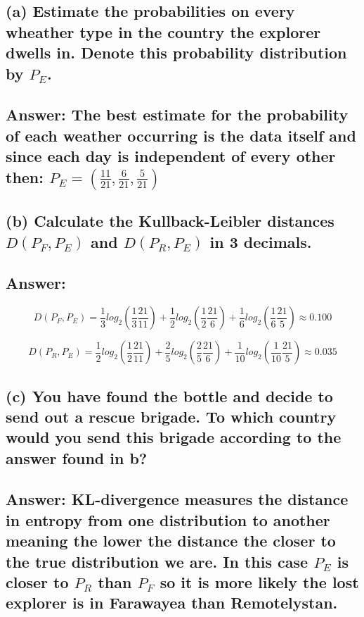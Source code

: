 \documentclass[11px]{article}
\begin{document}
\subsection*{\normalfont (a) Estimate the probabilities on every wheather type in the country the explorer dwells in. Denote this probability distribution by \(P_E\).}

\subsection*{Answer: The best estimate for the probability of each weather occurring is the data itself and since each day is independent of every other then: \(P_E = (\frac{11}{21}, \frac{6}{21}, \frac{5}{21})\)}

\subsection*{\normalfont (b) Calculate the Kullback-Leibler distances \(D(P_F,P_E)\) and \(D(P_R,P_E)\) in 3 decimals.}

\subsection*{Answer:}

\begin{equation}
D(P_F,P_E) = \frac{1}{3}log_2(\frac{1}{3}\frac{21}{11}) + \frac{1}{2}log_2(\frac{1}{2}\frac{21}{6}) + \frac{1}{6}log_2(\frac{1}{6}\frac{21}{5}) \approx 0.100
\end{equation}

\begin{equation}
D(P_R,P_E) = \frac{1}{2}log_2(\frac{1}{2}\frac{21}{11}) + \frac{2}{5}log_2(\frac{2}{5}\frac{21}{6}) + \frac{1}{10}log_2(\frac{1}{10}\frac{21}{5}) \approx 0.035
\end{equation}

\subsection*{\normalfont (c) You have found the bottle and decide to send out a rescue brigade. To which country would you send this brigade according to the answer found in b?}

\subsection*{Answer: KL-divergence measures the distance in entropy from one distribution to another meaning the lower the distance the closer to the true distribution we are. In this case \(P_E\) is closer to \(P_R\) than \(P_F\) so it is more likely the lost explorer is in Farawayea than Remotelystan.}
\end{document}
